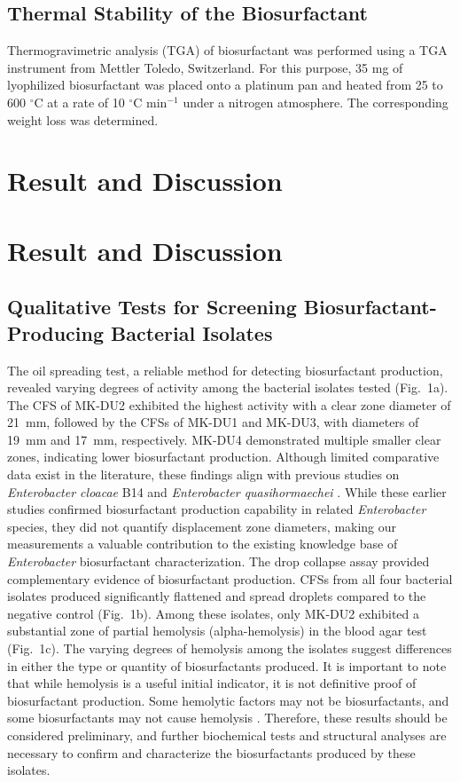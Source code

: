 \documentclass{svjour3}
\begin{document}
\subsection{Thermal Stability of the Biosurfactant}
Thermogravimetric analysis (TGA) of biosurfactant was performed using a TGA instrument from Mettler Toledo, Switzerland. For this purpose, 35 mg of lyophilized biosurfactant was placed onto a platinum pan and heated from 25 to 600 $^\circ$C at a rate of 10 $^\circ$C min$^{-1}$ under a nitrogen atmosphere. The corresponding weight loss was determined.
\section{Result and Discussion}

\section{Result and Discussion}
\subsection{Qualitative Tests for Screening Biosurfactant-Producing Bacterial Isolates}
The oil spreading test, a reliable method for detecting biosurfactant production, revealed varying degrees of activity among the bacterial isolates tested (Fig.~1a). The CFS of MK-DU2 exhibited the highest activity with a clear zone diameter of 21~mm, followed by the CFSs of MK-DU1 and MK-DU3, with diameters of 19~mm and 17~mm, respectively. MK-DU4 demonstrated multiple smaller clear zones, indicating lower biosurfactant production. Although limited comparative data exist in the literature, these findings align with previous studies on \textit{Enterobacter cloacae} B14 and \textit{Enterobacter quasihormaechei} \cite{14, 33}. While these earlier studies confirmed biosurfactant production capability in related \textit{Enterobacter} species, they did not quantify displacement zone diameters, making our measurements a valuable contribution to the existing knowledge base of \textit{Enterobacter} biosurfactant characterization.
The drop collapse assay provided complementary evidence of biosurfactant production. CFSs from all four bacterial isolates produced significantly flattened and spread droplets compared to the negative control (Fig.~1b).
Among these isolates, only MK-DU2 exhibited a substantial zone of partial hemolysis (alpha-hemolysis) in the blood agar test (Fig.~1c). The varying degrees of hemolysis among the isolates suggest differences in either the type or quantity of biosurfactants produced. It is important to note that while hemolysis is a useful initial indicator, it is not definitive proof of biosurfactant production. Some hemolytic factors may not be biosurfactants, and some biosurfactants may not cause hemolysis \cite{34}. Therefore, these results should be considered preliminary, and further biochemical tests and structural analyses are necessary to confirm and characterize the biosurfactants produced by these isolates.
\end{document}
